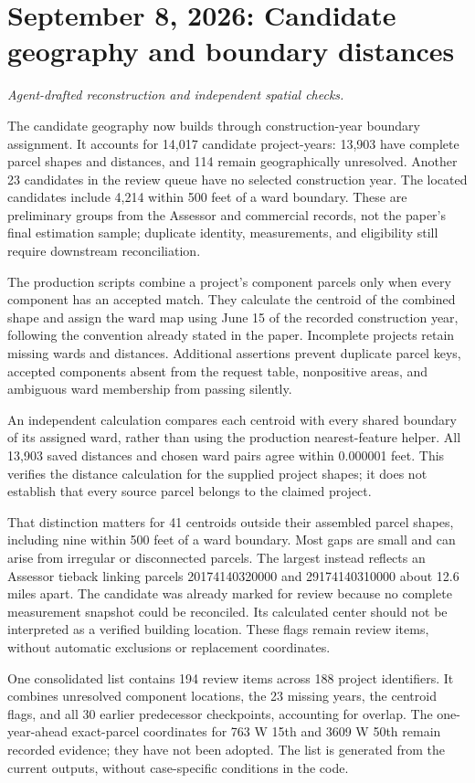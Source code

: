 \section*{September 8, 2026: Candidate geography and boundary distances}
\textit{Agent-drafted reconstruction and independent spatial checks.}

The candidate geography now builds through construction-year boundary assignment.
It accounts for 14,017 candidate project-years: 13,903 have complete parcel shapes
and distances, and 114 remain geographically unresolved. Another 23 candidates in
the review queue have no selected construction year. The located candidates include
4,214 within 500 feet of a ward boundary. These are preliminary groups from the
Assessor and commercial records, not the paper's final estimation sample; duplicate
identity, measurements, and eligibility still require downstream reconciliation.

The production scripts combine a project's component parcels only when every
component has an accepted match. They calculate the centroid of the combined
shape and assign the ward map using June 15 of the recorded construction year,
following the convention already stated in the paper. Incomplete projects retain
missing wards and distances. Additional assertions prevent duplicate parcel keys,
accepted components absent from the request table, nonpositive areas, and ambiguous
ward membership from passing silently.

An independent calculation compares each centroid with every shared boundary of
its assigned ward, rather than using the production nearest-feature helper. All
13,903 saved distances and chosen ward pairs agree within 0.000001 feet. This
verifies the distance calculation for the supplied project shapes; it does not
establish that every source parcel belongs to the claimed project.

That distinction matters for 41 centroids outside their assembled parcel shapes,
including nine within 500 feet of a ward boundary. Most gaps are small and can
arise from irregular or disconnected parcels. The largest instead reflects an
Assessor tieback linking parcels 20174140320000 and 29174140310000 about 12.6 miles
apart. The candidate was already marked for review because no complete measurement
snapshot could be reconciled. Its calculated center should not be interpreted as
a verified building location. These flags remain review items, without automatic
exclusions or replacement coordinates.

One consolidated list contains 194 review items across 188 project identifiers.
It combines unresolved component locations, the 23 missing years, the centroid
flags, and all 30 earlier predecessor checkpoints, accounting for overlap. The
one-year-ahead exact-parcel coordinates for 763 W 15th and 3609 W 50th remain
recorded evidence; they have not been adopted. The list is generated from the
current outputs, without case-specific conditions in the code.

